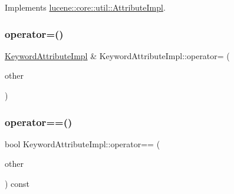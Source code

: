 Implements \mbox{\hyperlink{classlucene_1_1core_1_1util_1_1AttributeImpl_ab032e399d03ce2f58c76881cf2b92325}{lucene\+::core\+::util\+::\+Attribute\+Impl}}.

\mbox{\label{classlucene_1_1core_1_1analysis_1_1tokenattributes_1_1KeywordAttributeImpl_a26caf7be7512728452c2a5496788c39c}} 
\subsubsection{\texorpdfstring{operator=()}{operator=()}\hspace{0.1cm}{\footnotesize\ttfamily [2/2]}}
{\footnotesize\ttfamily \mbox{\hyperlink{classlucene_1_1core_1_1analysis_1_1tokenattributes_1_1KeywordAttributeImpl}{Keyword\+Attribute\+Impl}} \& Keyword\+Attribute\+Impl\+::operator= (\begin{DoxyParamCaption}\item[{\mbox{\hyperlink{ZlibCrc32_8h_a2c212835823e3c54a8ab6d95c652660e}{const}} \mbox{\hyperlink{classlucene_1_1core_1_1analysis_1_1tokenattributes_1_1KeywordAttributeImpl}{Keyword\+Attribute\+Impl}} \&}]{other }\end{DoxyParamCaption})}

\mbox{\label{classlucene_1_1core_1_1analysis_1_1tokenattributes_1_1KeywordAttributeImpl_a057cd81b19aa11973911473903ff84e3}} 
\subsubsection{\texorpdfstring{operator==()}{operator==()}}
{\footnotesize\ttfamily bool Keyword\+Attribute\+Impl\+::operator== (\begin{DoxyParamCaption}\item[{\mbox{\hyperlink{ZlibCrc32_8h_a2c212835823e3c54a8ab6d95c652660e}{const}} \mbox{\hyperlink{classlucene_1_1core_1_1analysis_1_1tokenattributes_1_1KeywordAttributeImpl}{Keyword\+Attribute\+Impl}} \&}]{other }\end{DoxyParamCaption}) const}

